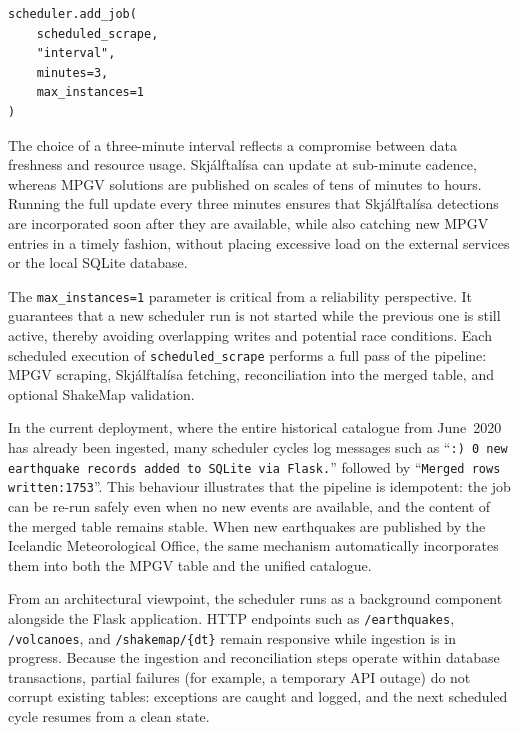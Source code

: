 \documentclass[12pt]{article}
\begin{document}
\begin{verbatim}
scheduler.add_job(
    scheduled_scrape,
    "interval",
    minutes=3,
    max_instances=1
)
\end{verbatim}

The choice of a three-minute interval reflects a compromise between data freshness and resource usage. Skjálftalísa can update at sub-minute cadence, whereas MPGV solutions are published on scales of tens of minutes to hours. Running the full update every three minutes ensures that Skjálftalísa detections are incorporated soon after they are available, while also catching new MPGV entries in a timely fashion, without placing excessive load on the external services or the local SQLite database.

The \texttt{max\_instances=1} parameter is critical from a reliability perspective. It guarantees that a new scheduler run is not started while the previous one is still active, thereby avoiding overlapping writes and potential race conditions. Each scheduled execution of \texttt{scheduled\_scrape} performs a full pass of the pipeline: MPGV scraping, Skjálftalísa fetching, reconciliation into the merged table, and optional ShakeMap validation.

In the current deployment, where the entire historical catalogue from June~2020 has already been ingested, many scheduler cycles log messages such as \enquote{\texttt{:)\ 0 new earthquake records added to SQLite via Flask.}} followed by \enquote{\texttt{Merged rows written:1753}}. This behaviour illustrates that the pipeline is idempotent: the job can be re-run safely even when no new events are available, and the content of the merged table remains stable. When new earthquakes are published by the Icelandic Meteorological Office, the same mechanism automatically incorporates them into both the MPGV table and the unified catalogue.

From an architectural viewpoint, the scheduler runs as a background component alongside the Flask application. HTTP endpoints such as \texttt{/earthquakes}, \texttt{/volcanoes}, and \texttt{/shakemap/\{dt\}} remain responsive while ingestion is in progress. Because the ingestion and reconciliation steps operate within database transactions, partial failures (for example, a temporary API outage) do not corrupt existing tables: exceptions are caught and logged, and the next scheduled cycle resumes from a clean state.

\vspace{0.7cm}
\end{document}
